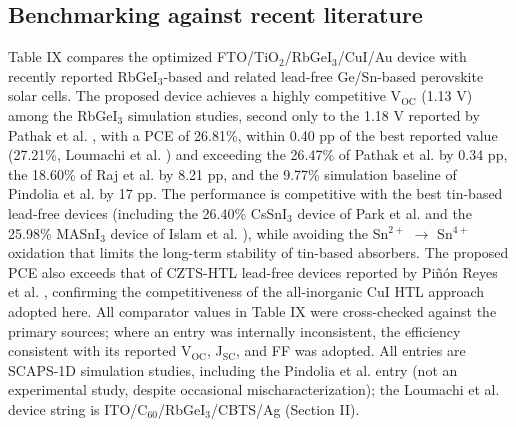 \documentclass[review]{elsarticle}
\begin{document}
\subsection{Benchmarking against recent literature}
Table IX compares the optimized FTO/\allowbreak{}TiO$_{2}$/RbGeI$_{3}$/CuI/\allowbreak{}Au device with recently reported RbGeI$_{3}$-based and related lead-free Ge/Sn-based perovskite solar cells. The proposed device achieves a highly competitive V$_{\mathrm{OC}}$ (1.13 V) among the RbGeI$_{3}$ simulation studies, second only to the 1.18 V reported by Pathak et al. \cite{r23}, with a PCE of 26.81\%, within 0.40 pp of the best reported value (27.21\%, Loumachi et al. \cite{r22}) and exceeding the 26.47\% of Pathak et al. \cite{r23} by 0.34 pp, the 18.60\% of Raj et al. \cite{r39} by 8.21 pp, and the 9.77\% simulation baseline of Pindolia et al. \cite{r14} by 17 pp. The performance is competitive with the best tin-based lead-free devices (including the 26.40\% CsSnI$_{3}$ device of Park et al. \cite{r40} and the 25.98\% MASnI$_{3}$ device of Islam et al. \cite{r41}), while avoiding the Sn$^{2+}$ $\rightarrow$ Sn$^{4+}$ oxidation that limits the long-term stability of tin-based absorbers. The proposed PCE also exceeds that of CZTS-HTL lead-free devices reported by Piñón Reyes et al. \cite{r42}, confirming the competitiveness of the all-inorganic CuI HTL approach adopted here.
All comparator values in Table IX were cross-checked against the primary sources; where an entry was internally inconsistent, the efficiency consistent with its reported V$_{\mathrm{OC}}$, J$_{\mathrm{SC}}$, and FF was adopted. All entries are SCAPS-1D simulation studies, including the Pindolia et al. entry (not an experimental study, despite occasional mischaracterization); the Loumachi et al. device string is ITO/\allowbreak{}C$_{60}$/RbGeI$_{3}$/CBTS/\allowbreak{}Ag (Section II).
\end{document}
